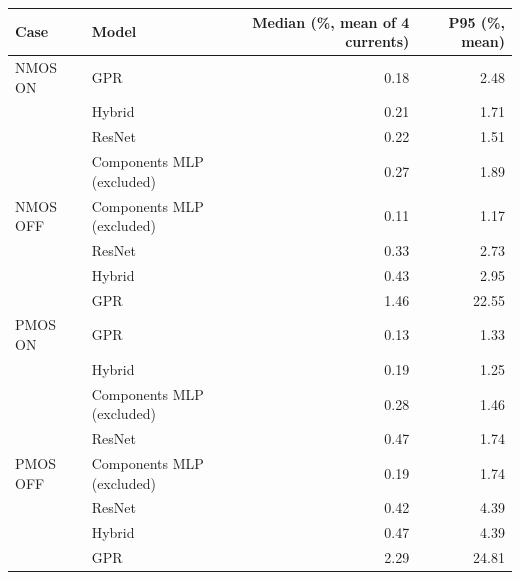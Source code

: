 \begin{tabular}{llrr}
\toprule
Case & Model & Median (\%, mean of 4 currents) & P95 (\%, mean) \\
\midrule
NMOS ON & GPR & 0.18 & 2.48 \\
 & Hybrid & 0.21 & 1.71 \\
 & ResNet & 0.22 & 1.51 \\
 & Components MLP (excluded) & 0.27 & 1.89 \\
\midrule
NMOS OFF & Components MLP (excluded) & 0.11 & 1.17 \\
 & ResNet & 0.33 & 2.73 \\
 & Hybrid & 0.43 & 2.95 \\
 & GPR & 1.46 & 22.55 \\
\midrule
PMOS ON & GPR & 0.13 & 1.33 \\
 & Hybrid & 0.19 & 1.25 \\
 & Components MLP (excluded) & 0.28 & 1.46 \\
 & ResNet & 0.47 & 1.74 \\
\midrule
PMOS OFF & Components MLP (excluded) & 0.19 & 1.74 \\
 & ResNet & 0.42 & 4.39 \\
 & Hybrid & 0.47 & 4.39 \\
 & GPR & 2.29 & 24.81 \\
\bottomrule
\end{tabular}
